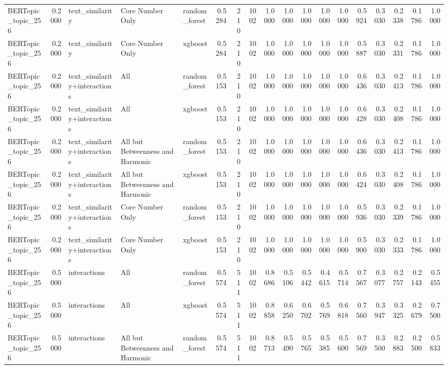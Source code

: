 \begin{tabular}{lrlllrrrrrrrrrrrrr}
BERTopic_topic_256 & 0.2000 & text_similarity & Core Number Only & random_forest & 0.5284 & 210 & 1002 & 1.0000 & 1.0000 & 1.0000 & 1.0000 & 1.0000 & 0.5924 & 0.3030 & 0.2338 & 0.1786 & 1.0000 \\
BERTopic_topic_256 & 0.2000 & text_similarity & Core Number Only & xgboost & 0.5284 & 210 & 1002 & 1.0000 & 1.0000 & 1.0000 & 1.0000 & 1.0000 & 0.5887 & 0.3030 & 0.2331 & 0.1786 & 1.0000 \\
BERTopic_topic_256 & 0.2000 & text_similarity+interactions & All & random_forest & 0.5153 & 210 & 1002 & 1.0000 & 1.0000 & 1.0000 & 1.0000 & 1.0000 & 0.6436 & 0.3030 & 0.2413 & 0.1786 & 1.0000 \\
BERTopic_topic_256 & 0.2000 & text_similarity+interactions & All & xgboost & 0.5153 & 210 & 1002 & 1.0000 & 1.0000 & 1.0000 & 1.0000 & 1.0000 & 0.6428 & 0.3030 & 0.2408 & 0.1786 & 1.0000 \\
BERTopic_topic_256 & 0.2000 & text_similarity+interactions & All but Betweenness and Harmonic & random_forest & 0.5153 & 210 & 1002 & 1.0000 & 1.0000 & 1.0000 & 1.0000 & 1.0000 & 0.6436 & 0.3030 & 0.2413 & 0.1786 & 1.0000 \\
BERTopic_topic_256 & 0.2000 & text_similarity+interactions & All but Betweenness and Harmonic & xgboost & 0.5153 & 210 & 1002 & 1.0000 & 1.0000 & 1.0000 & 1.0000 & 1.0000 & 0.6424 & 0.3030 & 0.2408 & 0.1786 & 1.0000 \\
BERTopic_topic_256 & 0.2000 & text_similarity+interactions & Core Number Only & random_forest & 0.5153 & 210 & 1002 & 1.0000 & 1.0000 & 1.0000 & 1.0000 & 1.0000 & 0.5936 & 0.3030 & 0.2339 & 0.1786 & 1.0000 \\
BERTopic_topic_256 & 0.2000 & text_similarity+interactions & Core Number Only & xgboost & 0.5153 & 210 & 1002 & 1.0000 & 1.0000 & 1.0000 & 1.0000 & 1.0000 & 0.5900 & 0.3030 & 0.2333 & 0.1786 & 1.0000 \\
BERTopic_topic_256 & 0.5000 & interactions & All & random_forest & 0.5574 & 511 & 1002 & 0.8686 & 0.5106 & 0.5442 & 0.4615 & 0.5714 & 0.7567 & 0.3077 & 0.2757 & 0.2143 & 0.5455 \\
BERTopic_topic_256 & 0.5000 & interactions & All & xgboost & 0.5574 & 511 & 1002 & 0.8858 & 0.6250 & 0.6702 & 0.5769 & 0.6818 & 0.7560 & 0.3947 & 0.3325 & 0.2679 & 0.7500 \\
BERTopic_topic_256 & 0.5000 & interactions & All but Betweenness and Harmonic & random_forest & 0.5574 & 511 & 1002 & 0.8713 & 0.5490 & 0.5765 & 0.5385 & 0.5600 & 0.7569 & 0.3500 & 0.2883 & 0.2500 & 0.5833 \\

\end{tabular}
